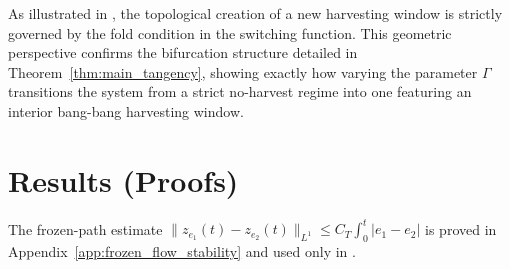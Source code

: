 \documentclass[a4paper,fleqn,longmktitle]{cas-sc}
\theoremstyle{plain}
\theoremstyle{definition}
\theoremstyle{remark}
\numberwithin{equation}{section}
\begin{document}
As illustrated in , the topological creation of a new harvesting window is strictly governed by the fold condition in the switching function. This geometric perspective confirms the bifurcation structure detailed in Theorem~\ref{thm:main_tangency}, showing exactly how varying the parameter $\Gamma$ transitions the system from a strict no-harvest regime into one featuring an interior bang-bang harvesting window.

\section{Results (Proofs)}
\label{sec:proofs}
The frozen-path estimate
\(\|z_{e_1}(t)-z_{e_2}(t)\|_{L^1}\le C_T\int_0^t|e_1-e_2|\) is proved in
Appendix~\ref{app:frozen_flow_stability} and used only in
.
\end{document}
